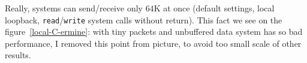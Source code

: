 \documentclass[a4paper]{article}
\begin{document}
Really, systems can send/receive only $64$K at once
(default settings, local loopback, \texttt{read}/\texttt{write} system calls
without return). This fact we see on the figure~\ref{local-C-ermine}:
with tiny packets and unbuffered data system has so bad performance,
I removed this point from picture, to avoid too small scale of other results.
\end{document}
